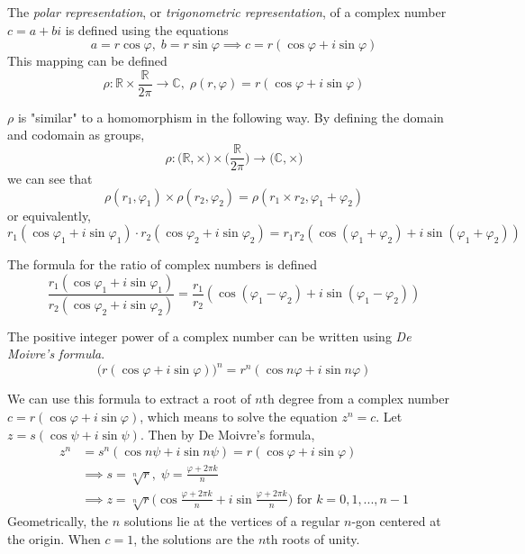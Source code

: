 \documentclass{article}
\begin{document}
      \begin{definition}
        The \textit{polar representation}, or \textit{trigonometric representation}, of a complex number $c = a + b i$ is defined using the equations 
        \[ a = r \cos{\varphi}, \; b = r\sin{\varphi} \implies c = r (\cos{\varphi} + i \sin{\varphi})\]
        This mapping can be defined 
        \[ \rho: \mathbb{R} \times \frac{\mathbb{R}}{2 \pi} \longrightarrow \mathbb{C}, \; \rho(r, \varphi) = r (\cos{\varphi} + i \sin{\varphi})\]
      \end{definition}

      \begin{theorem}
        $\rho$ is "similar" to a homomorphism in the following way. By defining the domain and codomain as groups, 
        \[ \rho: \big( \mathbb{R}, \times \big) \times \Big( \frac{\mathbb{R}}{2 \pi} \Big) \longrightarrow \big( \mathbb{C}, \times \big)\]
        we can see that
        \[ \rho (r_1, \varphi_1) \times \rho(r_2, \varphi_2) = \rho(r_1 \times r_2, \varphi_1 + \varphi_2) \]
        or equivalently, 
        \[r_1 (\cos{\varphi_1} + i \sin{\varphi_1}) \cdot r_2 (\cos{\varphi_2} + i \sin{\varphi_2}) = r_1 r_2 (\cos{(\varphi_1 + \varphi_2)} + i \sin{(\varphi_1 + \varphi_2)})\]
      \end{theorem}

      \begin{corollary}
        The formula for the ratio of complex numbers is defined
        \[ \frac{r_1 (\cos{\varphi_1} + i \sin{\varphi_1})}{r_2 (\cos{\varphi_2} + i \sin{\varphi_2})} = \frac{r_1}{r_2} (\cos{(\varphi_1 - \varphi_2)} + i \sin{(\varphi_1 - \varphi_2)})\]
      \end{corollary}

      \begin{corollary}
        The positive integer power of a complex number can be written using \textit{De Moivre's formula}. 
        \[ \big(r(\cos{\varphi} + i \sin{\varphi})\big)^n = r^n (\cos{n \varphi} + i \sin{n \varphi})\]
      \end{corollary}

      We can use this formula to extract a root of $n$th degree from a complex number $c = r(\cos{\varphi} + i \sin{\varphi})$, which means to solve the equation $z^n = c$. Let $z = s (\cos{\psi} + i \sin{\psi})$. Then by De Moivre's formula, 
      \begin{align*}
        z^n & = s^n (\cos{n \psi} + i \sin{n \psi}) = r(\cos{\varphi} + i \sin{\varphi}) \\
        & \implies s = \sqrt[n]{r}, \; \psi = \frac{\varphi + 2\pi k}{n} \\
        & \implies z = \sqrt[n]{r} \bigg( \cos{\frac{\varphi + 2\pi k}{n}} + i \sin{\frac{\varphi + 2\pi k}{n}}\bigg) \text{ for } k = 0, 1, ..., n-1
      \end{align*}
      Geometrically, the $n$ solutions lie at the vertices of a regular $n$-gon centered at the origin. When $c = 1$, the solutions are the $n$th roots of unity.
\end{document}
